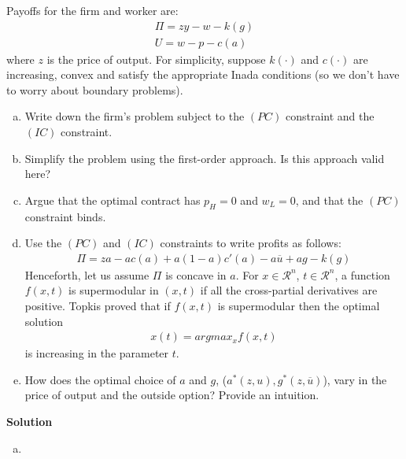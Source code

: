 \documentclass[a4paper]{article}
\newcommand{\ubar}{\overline}
\begin{document}
Payoffs for the firm and worker are:
\begin{align*}
\Pi = zy - w - k(g)\\
U = w - p -c(a)
\end{align*}
where $z$ is the price of output. For simplicity, suppose $k(\cdot)$ and $c(\cdot)$ are increasing,
convex and satisfy the appropriate Inada conditions (so we don't have to worry about
boundary problems).
\begin{enumerate}[(a)]
\item Write down the firm's problem subject to the $(PC)$ constraint and the $(IC)$ constraint.
\item Simplify the problem using the first-order approach. Is this approach valid here?
\item Argue that the optimal contract has $p_H = 0$ and $w_L = 0$, and that the $(PC)$ constraint binds.
\item Use the $(PC)$ and $(IC)$ constraints to write profits as follows:
\begin{align*}
\Pi = za - ac(a) + a(1-a)c'(a) - a\ubar{u} + ag-k(g)
\end{align*}
Henceforth, let us assume $\Pi$ is concave in $a$. For $x \in \mathscr{R}^n$, $t \in \mathscr{R}^n$, a function $f(x, t)$ is supermodular in $(x, t)$ if all the cross-partial derivatives are positive. Topkis proved that
if $f(x, t)$ is supermodular then the optimal solution
\begin{align*}
x(t) = argmax_xf(x, t)
\end{align*}
is increasing in the parameter $t$.
\item How does the optimal choice of $a$ and $g$, ($a^*(z, u), g^*(z, \ubar{u})$), vary in the price of
output and the outside option? Provide an intuition.
\end{enumerate}


\textbf{Solution}

\begin{enumerate}[(a)]
	\item 
\end{enumerate}
\end{document}
